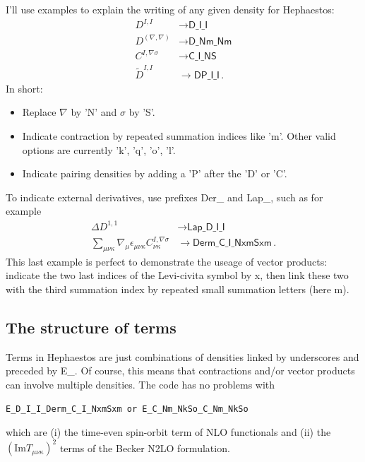 \documentclass[print,amsmath,amssymb,aps,prc,nofootinbib,notitlepage]{revtex4-1}
\renewcommand{\Im}{\text{Im}}
\begin{document}
I'll use examples to explain the writing of any given density for Hephaestos:
%
\begin{align}
D^{I,I}             &\rightarrow \textsf{D\_I\_I} \\
D^{(\nabla,\nabla)} &\rightarrow \textsf{D\_Nm\_Nm} \\
C^{I,\nabla\sigma}  &\rightarrow \textsf{C\_I\_NS} \\
\tilde{D}^{I,I}     &\rightarrow \textsf{DP\_I\_I} \, .
\end{align}
%
In short: 
\begin{itemize}
\item Replace $\nabla$ by \textsf{'N'} and $\sigma$ by \textsf{'S'}.
\item Indicate contraction by repeated summation indices like \textsf{'m'}. Other
      valid options are currently \textsf{'k', 'q', 'o', 'l'}.
\item Indicate pairing densities by adding a \textsf{'P'} after the \textsf{'D'}
      or \textsf{'C'}.     
\end{itemize}
%
To indicate external derivatives, use prefixes \textsf{Der\_} and \textsf{Lap\_}, 
such as for example
\begin{align}
\Delta D^{1,1}                  &\rightarrow \textsf{Lap\_D\_I\_I} \\
\sum_{\mu \nu \kappa} \nabla_{\mu} \epsilon_{\mu\nu\kappa} C_{\nu \kappa}^{I, \nabla \sigma}   &\rightarrow \textsf{Derm\_C\_I\_NxmSxm}\, .
\end{align}
%
This last example is perfect to demonstrate the useage of vector products: indicate
the two last indices of the Levi-civita symbol by \textsf{x}, then link these two
with the third summation index by repeated small summation letters (here \textsf{m}).

\subsection{The structure of terms}

Terms in Hephaestos are just combinations of densities linked by underscores and 
preceded by \textsf{E\_}. Of course, this means
that contractions and/or vector products can involve multiple densities. The 
code has no problems with 
%
\begin{Verbatim}
E_D_I_I_Derm_C_I_NxmSxm or E_C_Nm_NkSo_C_Nm_NkSo 
\end{Verbatim}
%
which are (i) the time-even spin-orbit term of NLO functionals and (ii) the 
$\left(\Im T_{\mu \nu \kappa}\right)^2$ terms of the Becker N2LO formulation. 
\end{document}
